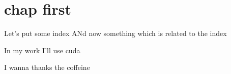 \documentclass[
	10pt,
	twoside,
]{scrbook}
\title{}
\subtitle{}
\author{
  
}
\date{}
\begin{document}
%
\frontmatter
{}
	\maketitle
	\thispagestyle{empty}

	\cleardoublepage
{}
	\tableofcontents

	

%
\mainmatter
\chapter{chap first}
\lipsum


Let's put some index
ANd now something which is related to the index




In my work I'll use \gls{cuda}


I wanna thanks the coffeine


%
\backmatter
	\printnoidxglossaries

	\cleardoublepage
	\printindex

	\cleardoublepage
	\nocite{*}
	\printbibliography
\end{document}
